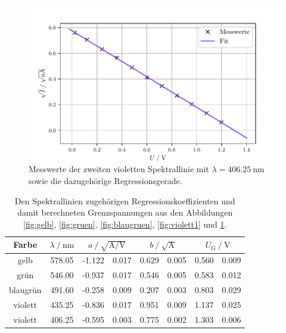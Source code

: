 \begin{figure}[H]
  \centering
  \includegraphics{violett2.pdf}
  \caption{Messwerte der zweiten violetten Spektrallinie mit $\lambda = \SI{406.25}{\nano\meter}$ sowie die dazugehörige Regressionsgerade.}
  \label{fig:violett2}
\end{figure}

\begin{table}[H]
  \centering
  \caption{Den Spektrallinien zugehörigen Regressionskoeffizienten und damit berechneten Grenzspannungen aus den Abbildungen \ref{fig:gelb}, \ref{fig:gruen},
  \ref{fig:blaugruen}, \ref{fig:violett1} und \ref{fig:violett2}.}
  \label{tab:grenz}
  \begin{tabular}{c S[table-format=3.2]
    S[table-format=2.3]@{${}\pm{}$}S[table-format=1.3]
    S[table-format=1.3]@{${}\pm{}$}S[table-format=1.3]
    S[table-format=1.3]@{${}\pm{}$}S[table-format=1.3]}
    \toprule
    {Farbe} & {$\lambda \:/\: \si{\nano\meter}$} &  &
     & \\
    \midrule
    gelb          &   578.05   &   -1.122  &  0.017    &    0.629  &  0.005    &    0.560  &   0.009 \\
    grün          &   546.00   &   -0.937  &  0.017    &    0.546  &  0.005    &    0.583  &   0.012 \\
    blaugrün      &   491.60   &   -0.258  &  0.009    &    0.207  &  0.003    &    0.803  &   0.029 \\
    violett       &   435.25   &   -0.836  &  0.017    &    0.951  &  0.009    &    1.137  &   0.025 \\
    violett       &   406.25   &   -0.595  &  0.003    &    0.775  &  0.002    &    1.303  &   0.006 \\
    \bottomrule
  \end{tabular}
\end{table}

